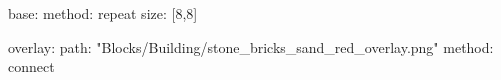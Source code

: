 base:
  method: repeat
  size: [8,8]

overlay:
  path: "Blocks/Building/stone_bricks_sand_red_overlay.png"
  method: connect